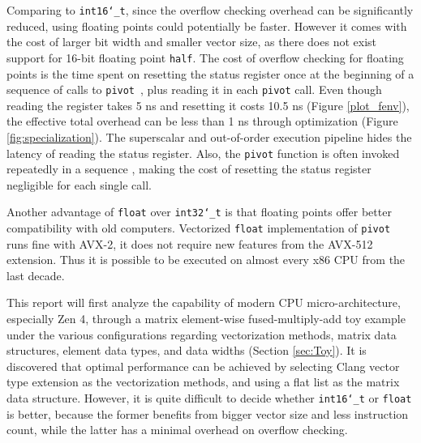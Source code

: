 \documentclass[logo,bsc,singlespacing,parskip]{infthesis}
\newcommand{\dtshort}{\texttt{int16\char`_t}}
\newcommand{\dtint}{\texttt{int32\char`_t}}
\newcommand{\dtfloat}{\texttt{float}}
\newcommand{\pivot}{\texttt{pivot}}
\begin{document}
Comparing to \dtshort{}, since the overflow checking overhead can be
significantly reduced, using floating points could potentially be faster.
However it comes with the cost of larger bit width and smaller vector size, as
there does not exist support for 16-bit floating point \texttt{half}. The cost
of overflow checking for floating points is the time spent on resetting the
status register once at the beginning of a sequence of calls to
\pivot{}~\cite{FPL1}, plus reading it in each \pivot{} call. Even though reading
the register takes 5 ns and resetting it costs 10.5 ns (Figure \ref{plot_fenv}),
the effective total overhead can be less than 1 ns through optimization (Figure
\ref{fig:specialization}). The superscalar and out-of-order execution pipeline
hides the latency of reading the status register. Also, the \pivot{} function is
often invoked repeatedly in a sequence \cite{FPL1}, making the cost of resetting
the status register negligible for each single call. 



Another advantage of \dtfloat{} over \dtint{} is that floating points offer
better compatibility with old computers. Vectorized \dtfloat{} implementation of
\pivot{} runs fine with AVX-2, it does not require new features from the AVX-512
extension. Thus it is possible to be executed on almost every x86 CPU from the
last decade. 

This report will first analyze the capability of modern CPU micro-architecture,
especially Zen 4, through a matrix element-wise fused-multiply-add toy
example under the various configurations regarding vectorization methods, matrix
data structures, element data types, and data widths (Section \ref{sec:Toy}). 
It is discovered that optimal performance can be achieved by selecting Clang
vector type extension as the vectorization methods, and using a flat list as the
matrix data structure. However, it is quite difficult to decide whether
\dtshort{} or \dtfloat{} is better, because the former benefits from bigger
vector size and less instruction count, while the latter has a minimal overhead
on overflow checking. 
\end{document}

